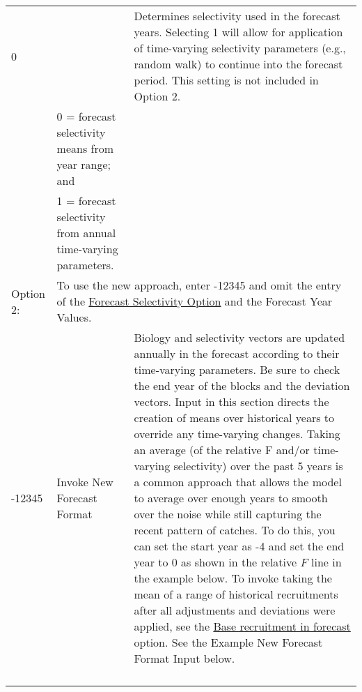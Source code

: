 \begin{landscape}
{\begin{longtable}{p{2cm} p{7cm} p{12cm}}
  0 & \raisebox{0.1\ht\strutbox}{\hypertarget{FcastSelectivity}{Forecast Selectivity Option}} & \multirow{1}{1cm}[-0.15cm]{\parbox{12cm}{Determines selectivity used in the forecast years. Selecting 1 will allow for application of time-varying selectivity parameters (e.g., random walk) to continue into the forecast period. This setting is not included in Option 2.}} \\
    & 0 = forecast selectivity means from year range; and & \\
    & 1 = forecast selectivity from annual time-varying parameters. & \\

  Option 2: & \multicolumn{2}{l}{\multirow{1}{1cm}[-0.15cm]{\parbox{18.5cm}{To use the new approach, enter -12345 and omit the entry of the \hyperlink{FcastSelectivity}{Forecast Selectivity Option} and the Forecast Year Values.}}} \\

  -12345 & Invoke New Forecast Format & \multirow{1}{1cm}[-0.15cm]{\parbox{12cm}{Biology and selectivity vectors are updated annually in the forecast according to their time-varying parameters. Be sure to check the end year of the blocks and the deviation vectors. Input in this section directs the creation of means over historical years to override any time-varying changes. Taking an average (of the relative F and/or time-varying selectivity) over the past 5 years is a common approach that allows the model to average over enough years to smooth over the noise while still capturing the recent pattern of catches. To do this, you can set the start year as -4 and set the end year to 0 as shown in the relative $F$ line in the example below. To invoke taking the mean of a range of historical recruitments after all adjustments and deviations were applied, see the \hyperlink{FcastRecruitment}{Base recruitment in forecast} option. See the Example New Forecast Format Input below.}} \Tstrut\Bstrut\\
   & & \\
   & & \Bstrut\\
   & & \Tstrut\Bstrut\\
   & & \Tstrut\Bstrut\\
  

\end{longtable}}
\end{landscape}
